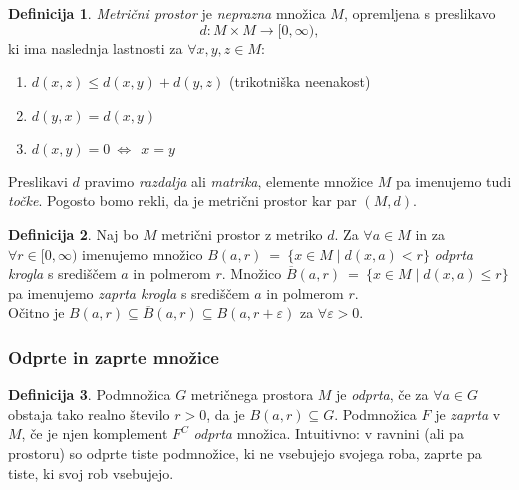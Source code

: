 \documentclass[11pt]{article}
\theoremstyle{definition}
\newtheorem{definicija}{Definicija}[section]
\theoremstyle{definition}
\theoremstyle{definition}
\begin{document}
\begin{definicija}

\textit{Metrični prostor} je \textit{neprazna} množica $M$, opremljena s preslikavo
$$d: M \times M \rightarrow [0, \infty),$$
ki ima naslednja lastnosti za $\forall x, y, z \in M$:
\begin{enumerate}
	\item $d(x, z) \leq d(x, y) + d(y, z)$ (trikotniška neenakost)
	\item $d(y, x) = d(x, y)$
	\item $d(x, y) = 0 ~\iff~~ x = y$
\end{enumerate}
Preslikavi $d$ pravimo \textit{razdalja} ali \textit{matrika}, elemente množice $M$ pa imenujemo tudi \textit{točke}. Pogosto bomo rekli, da je metrični prostor kar par $(M, d)$.

\end{definicija}
\vspace{0.5cm}

\begin{definicija}

Naj bo $M$ metrični prostor z metriko $d$. Za $\forall a \in M$ in za $\forall r \in [0, \infty)$ imenujemo množico 
$B(a, r) ~=~ \{x \in M \mid d(x, a) < r\}$
\textit{odprta krogla} s središčem $a$ in polmerom $r$. Množico 
\hbox{$\overline{B}(a, r) ~=~ \{x \in M \mid d(x, a) \leq r\}$}
pa imenujemo \textit{zaprta krogla} s središčem $a$ in polmerom $r$. \\

\noindent Očitno je $B(a, r) \subseteq \overline{B}(a, r) \subseteq B(a, r + \varepsilon)$ za $\forall \varepsilon > 0$.

\end{definicija}
\vspace{0.5cm}


\subsubsection{Odprte in zaprte množice}
\vspace{0.5cm}

\begin{definicija}

Podmnožica $G$ metričnega prostora $M$ je \textit{odprta}, če za $\forall a \in G$ obstaja tako realno število $r > 0$, da je $B(a, r) \subseteq G$. Podmnožica $F$ je \textit{zaprta} v $M$, če je njen komplement $F^C$ \textit{odprta} množica. Intuitivno: v ravnini (ali pa prostoru) so odprte tiste podmnožice, ki ne vsebujejo svojega roba, zaprte pa tiste, ki svoj rob vsebujejo.

\end{definicija}
\vspace{0.5cm}
\end{document}
